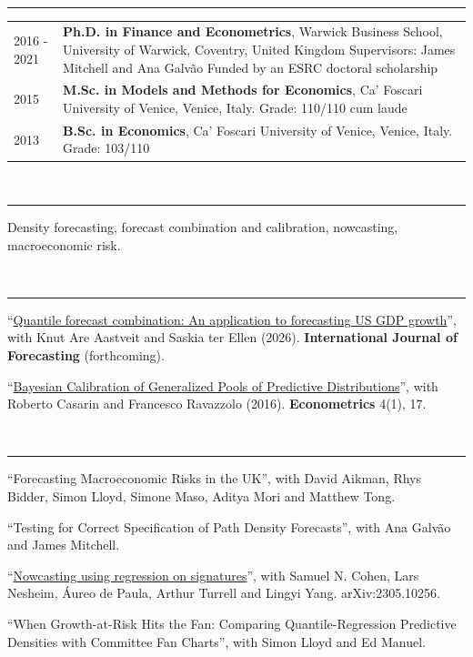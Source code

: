 \documentclass[11pt,a4paper]{article}
\makeatletter
\newcommand{\cvsection}[1]{\vspace{10pt}{\small\bfseries #1}\\[-7pt]\rule{\linewidth}{0.6pt}\vspace{2pt}}
\newenvironment{cvtable}{\small\begin{longtable}{@{}p{3.3cm}p{\dimexpr\linewidth-3.3cm-2\tabcolsep\relax}@{}}}{\end{longtable}\vspace{-14pt}}
\makeatother
\begin{document}
\cvsection{Education}
\begin{cvtable}
2016 - 2021 & \textbf{Ph.D. in Finance and Econometrics}, Warwick Business School, University of Warwick, Coventry, United Kingdom\newline
Supervisors: James Mitchell and Ana Galv\~ao\newline
Funded by an ESRC doctoral scholarship \\
2015 & \textbf{M.Sc. in Models and Methods for Economics}, Ca' Foscari University of Venice, Venice, Italy. Grade: 110/110 cum laude \\
2013 & \textbf{B.Sc. in Economics}, Ca' Foscari University of Venice, Venice, Italy. Grade: 103/110 \\
\end{cvtable}

\cvsection{Research Interests}
{\small Density forecasting, forecast combination and calibration, nowcasting, macroeconomic risk.}

\cvsection{Publications in Refereed Journals}
\begin{pubs}\small
\item ``\href{https://www.sciencedirect.com/science/article/abs/pii/S0169207026000580}{Quantile forecast combination: An application to forecasting US GDP growth}'', with Knut Are Aastveit and Saskia ter Ellen (2026). \textbf{International Journal of Forecasting} (forthcoming).
\item ``\href{https://www.mdpi.com/2225-1146/4/1/17}{Bayesian Calibration of Generalized Pools of Predictive Distributions}'', with Roberto Casarin and Francesco Ravazzolo (2016). \textbf{Econometrics} 4(1), 17.
\end{pubs}

\cvsection{Working Papers}
\begin{pubs}[resume]\small
\item ``Forecasting Macroeconomic Risks in the UK'', with David Aikman, Rhys Bidder, Simon Lloyd, Simone Maso, Aditya Mori and Matthew Tong.
\item ``Testing for Correct Specification of Path Density Forecasts'', with Ana Galv\~ao and James Mitchell.
\item ``\href{https://arxiv.org/abs/2305.10256}{Nowcasting using regression on signatures}'', with Samuel N. Cohen, Lars Nesheim, \'Aureo de Paula, Arthur Turrell and Lingyi Yang. arXiv:2305.10256.
\item ``When Growth-at-Risk Hits the Fan: Comparing Quantile-Regression Predictive Densities with Committee Fan Charts'', with Simon Lloyd and Ed Manuel.
\end{pubs}
\end{document}
